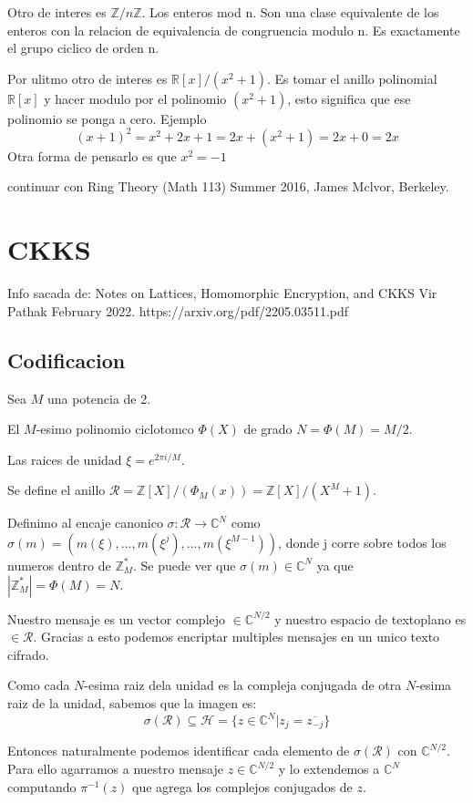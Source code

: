 \documentclass[12pt, oneside]{article}
\newcommand{\Hc}{\mathcal{H}}
\newcommand{\Rc}{\mathcal{R}}
\newcommand{\R}{\mathbb{R}}
\newcommand{\C}{\mathbb{C}}
\newcommand{\Z}{\mathbb{Z}}
\begin{document}
Otro de interes es  $\Z/n\Z$. Los enteros mod n.
Son una clase equivalente de los enteros con la relacion de equivalencia de congruencia
modulo n.
Es exactamente el grupo ciclico de orden n.

Por ulitmo otro de interes es $\R[x]/(x^2+1)$.
Es tomar el anillo polinomial $\R[x]$ y hacer modulo por el polinomio $(x^2+1)$,
esto significa que ese polinomio se ponga a cero.
Ejemplo
\begin{equation*}
  (x+1)^2 = x^2 + 2x + 1 = 2x + (x^2 + 1) = 2x + 0 = 2x
\end{equation*}
Otra forma de pensarlo es que $x^2 = -1$

continuar con Ring Theory (Math 113) Summer 2016, James Mclvor, Berkeley.

\section{CKKS}
Info sacada de:
Notes on Lattices, Homomorphic Encryption, and CKKS
Vir Pathak
February 2022.
https://arxiv.org/pdf/2205.03511.pdf
\subsection{Codificacion}
Sea $M$ una potencia de 2.

El $M$-esimo polinomio ciclotomco $\Phi(X)$ de grado $N=\Phi(M)=M/2$.

Las raices de unidad $\xi=e^{2\pi i/M}$.

Se define el anillo $\Rc=\Z[X]/(\Phi_M(x))=\Z[X]/(X^M+1)$.

Definimo al encaje canonico $\sigma: \Rc\to\C^N$ como
$\sigma(m)=(m(\xi),...,m(\xi^j),...,m(\xi^{M-1}))$, donde j corre sobre todos los
numeros dentro de $\Z^*_M$.
Se puede ver que $\sigma(m)\in\C^N$ ya que $|\Z^*_M|=\Phi(M)=N$.

Nuestro mensaje es un vector complejo $\in\C^{N/2}$ y nuestro espacio de textoplano
es $\in\Rc$.
Gracias a esto podemos encriptar multiples mensajes en un unico texto cifrado.

Como cada $N$-esima raiz dela unidad es la compleja conjugada de otra
$N$-esima raiz de la unidad, sabemos que la imagen es:
\begin{equation*}
\sigma(\Rc)\subseteq\Hc=\{z\in\C^N|z_j=\overline{z_{-j}}\}
\end{equation*}

Entonces naturalmente podemos identificar cada elemento de $\sigma(\Rc)$ con $\C^{N/2}$.
Para ello agarramos a nuestro mensaje $z\in\C^{N/2}$ y lo extendemos a $\C^N$ computando
$\pi^{-1}(z)$ que agrega los complejos conjugados de $z$.
\end{document}
